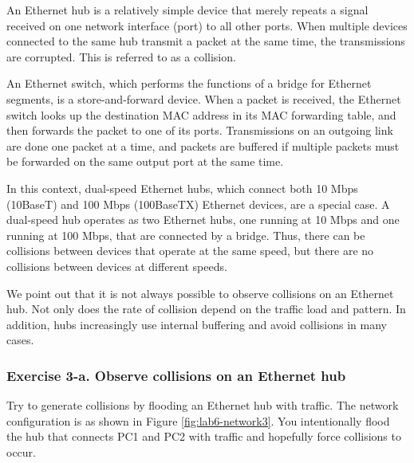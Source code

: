 An Ethernet hub is a relatively simple device that merely repeats a signal received on one network interface (port) to all other ports. When multiple devices connected to the same hub transmit a packet at the same time, the transmissions are corrupted. This is referred to as a collision.

An Ethernet switch, which performs the functions of a bridge for Ethernet segments, is a store-and-forward device. When a packet is received, the Ethernet switch looks up the destination MAC address in its MAC forwarding table, and then forwards the packet to one of its ports. Transmissions on an outgoing link are done one packet at a time, and packets are buffered if multiple packets must be forwarded on the same output port at the same time.

In this context, dual-speed Ethernet hubs, which connect both 10 Mbps (10BaseT) and 100 Mbps (100BaseTX) Ethernet devices, are a special case. A dual-speed hub operates as two Ethernet hubs, one running at 10 Mbps and one running at 100 Mbps, that are connected by a bridge. Thus, there can be collisions between devices that operate at the same speed, but there are no collisions between devices at different speeds.

We point out that it is not always possible to observe collisions on an Ethernet hub. Not only does the rate of collision depend on the traffic load and pattern. In addition, hubs increasingly use internal buffering and avoid collisions in many cases.

\subsubsection{Exercise 3-a. Observe collisions on an Ethernet hub}
Try to generate collisions by flooding an Ethernet hub with traffic. The network configuration is as shown in Figure \ref{fig:lab6-network3}. You intentionally flood the hub that connects PC1 and PC2 with traffic and hopefully force collisions to occur.

